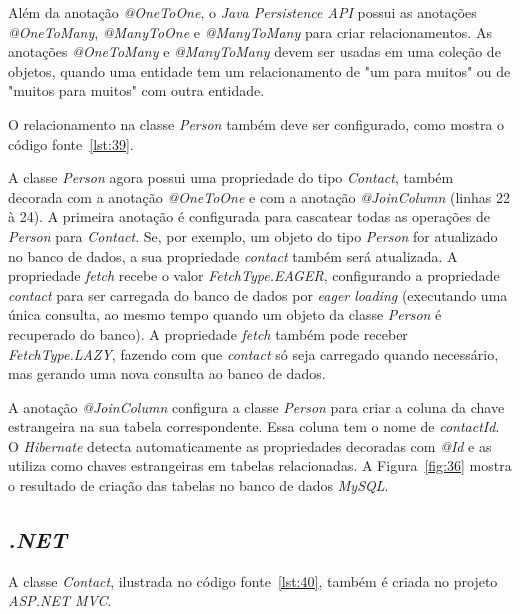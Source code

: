 Além da anotação \textit{@OneToOne}, o \textit{Java Persistence API} possui as anotações \textit{@OneToMany}, \textit{@ManyToOne} e \textit{@ManyToMany} para criar relacionamentos. As anotações \textit{@OneToMany} e \textit{@ManyToMany} devem ser usadas em uma coleção de objetos, quando uma entidade tem um relacionamento de "um para muitos" ou de "muitos para muitos" com outra entidade.

O relacionamento na classe \textit{Person} também deve ser configurado, como mostra o código fonte~\ref{lst:39}.


A classe \textit{Person} agora possui uma propriedade do tipo \textit{Contact}, também decorada com a anotação \textit{@OneToOne} e com a anotação \textit{@JoinColumn} (linhas 22 à 24). A primeira anotação é configurada para cascatear todas as operações de \textit{Person} para \textit{Contact}. Se, por exemplo, um objeto do tipo \textit{Person} for atualizado no banco de dados, a sua propriedade \textit{contact} também será atualizada. A propriedade \textit{fetch} recebe o valor \textit{FetchType.EAGER}, configurando a propriedade \textit{contact} para ser carregada do banco de dados por \textit{eager loading} (executando uma única consulta, ao mesmo tempo quando um objeto da classe \textit{Person} é recuperado do banco). A propriedade \textit{fetch} também pode receber \textit{FetchType.LAZY}, fazendo com que \textit{contact} só seja carregado quando necessário, mas gerando uma nova consulta ao banco de dados.

A anotação \textit{@JoinColumn} configura a classe \textit{Person} para criar a coluna da chave estrangeira na sua tabela correspondente. Essa coluna tem o nome de \textit{contactId}. O \textit{Hibernate} detecta automaticamente as propriedades decoradas com \textit{@Id} e as utiliza como chaves estrangeiras em tabelas relacionadas. A Figura~\ref{fig:36} mostra o resultado de criação das tabelas no banco de dados \textit{MySQL}. 


\subsection{\textit{.NET}}

A classe \textit{Contact}, ilustrada no código fonte~\ref{lst:40}, também é criada no projeto \textit{ASP.NET MVC}.

